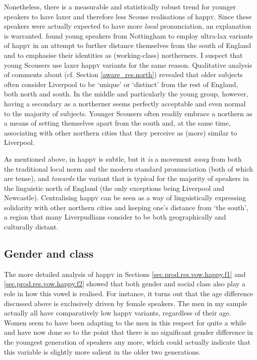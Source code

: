 Nonetheless, there is a measurable and statistically robust trend for younger speakers to have laxer and therefore less Scouse realisations of happ\textsc{y}.
Since these speakers were actually expected to have more \emph{local} pronunciation, an explanation is warranted.
\textcite{flynn2010} found young speakers from Nottingham to employ ultra-lax variants of happ\textsc{y} in an attempt to further distance themselves from the south of England and to emphasise their identities as (working-class) northerners.
I suspect that young Scousers use laxer happ\textsc{y} variants for the same reason.
Qualitative analysis of comments about  (cf. Section \ref{aware_res.north}) revealed that older subjects often consider Liverpool to be `unique' or `distinct' from the rest of England, both north and south.
In the middle and particularly the young group, however, having a secondary  as a northerner seems perfectly acceptable and even normal to the majority of subjects.
Younger Scousers often readily embrace a northern  as a means of setting themselves apart from the south and, at the same time, associating with other northern cities that they perceive as (more) similar to Liverpool.

As mentioned above,  in happ\textsc{y} is subtle, but it \emph{is} a movement \emph{away} from both the traditional local norm and the modern standard pronunciation (both of which are tense), and \emph{towards} the variant that is typical for the majority of speakers in the linguistic north of England (the only exceptions being Liverpool and Newcastle).
Centralising happ\textsc{y} can be seen as a way of linguistically expressing solidarity with other northern cities and keeping one's distance from `the south', a region that many Liverpudlians consider to be both geographically and culturally distant.

\subsection{Gender and class}
\label{prod.disc.happy.social}

The more detailed analysis of happ\textsc{y} in Sections \ref{sec.prod.res.vow.happy.f1} and \ref{sec.prod.res.vow.happy.f2} showed that both gender and social class also play a role in how this vowel is realised.
For instance, it turns out that the age difference discussed above is exclusively driven by female speakers.
The men in my sample actually all have comparatively low happ\textsc{y} variants, regardless of their age.
Women seem to have been adapting to the men in this respect for quite a while and have now done so to the point that there is no significant gender difference in the youngest generation of speakers any more, which could actually indicate that this variable is slightly more salient in the older two generations.


